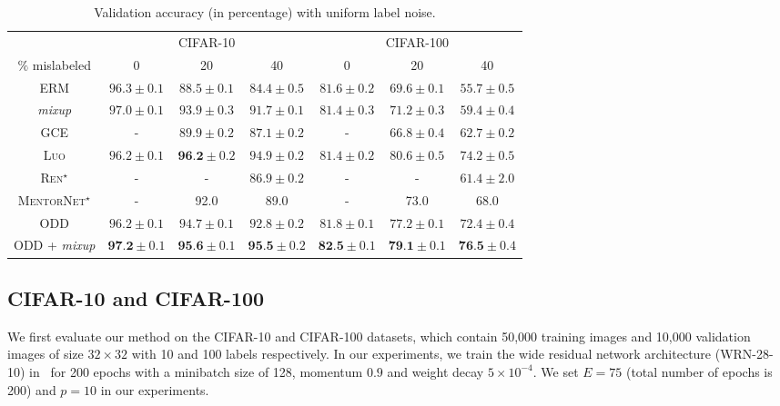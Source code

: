 \documentclass[a4paper,11pt]{article}
\begin{document}
\begin{table*}[htbp]
\begin{center}
\caption{Validation accuracy (in percentage) with uniform label noise.}
\label{tab:cifar-val}
\begin{tabular}{c|ccc|ccc}
\toprule
& \multicolumn{3}{c|}{CIFAR-10} & \multicolumn{3}{c}{CIFAR-100} \\
$\%$ mislabeled                                           & 0                              & 20                              & 40                & 0 & 20 & 40             \\\midrule
\textsc{ERM}                                           & $96.3 \pm 0.1$ & $88.5 \pm 0.1$ & $84.4 \pm 0.5$ &  $81.6 \pm 0.2$ & $69.6 \pm 0.1$ & $55.7 \pm 0.5$ \\
\textit{mixup}                                                &           ${97.0} \pm 0.1$     & $93.9 \pm 0.3$ & $91.7 \pm 0.1$  & $81.4 \pm 0.3$ & $71.2 \pm 0.3$ & $59.4 \pm 0.4$  \\
\textsc{GCE}     &  -  & $89.9 \pm 0.2$  & $87.1 \pm 0.2$  & - & $66.8 \pm 0.4$ & $62.7 \pm 0.2$ \\
\textsc{Luo} & $96.2 \pm 0.1 $ & $\textbf{96.2} \pm 0.2$ & $94.9 \pm 0.2$ & $81.4 \pm 0.2$ & $80.6 \pm 0.5$ & $74.2 \pm 0.5$ \\
\midrule
\textsc{Ren}$^\star$   &    -    &    -     & $86.9 \pm 0.2$ & - & - & $61.4 \pm 2.0$  \\
\textsc{MentorNet}$^\star$ &   -      & 92.0    & 89.0  & - & 73.0 & 68.0 \\\midrule
\textsc{ODD}                              & $96.2 \pm 0.1$ & ${94.7} \pm 0.1$  & ${92.8} \pm 0.2$ & ${81.8} \pm 0.1$ & ${77.2} \pm 0.1$  & ${72.4} \pm 0.4$    \\
\textsc{ODD} + \textit{mixup}                              & $\textbf{97.2} \pm 0.1$ & $\textbf{95.6} \pm 0.1$  & $\textbf{95.5} \pm 0.2$ & $\textbf{82.5} \pm 0.1$ & $\textbf{79.1} \pm 0.1$  & $\textbf{76.5} \pm 0.4$    \\
\bottomrule                          
\end{tabular}
\end{center}
\end{table*}

\subsection{CIFAR-10 and CIFAR-100}
\label{sec:exp-cifar}
We first evaluate our method on the CIFAR-10 and CIFAR-100 datasets, which contain 50,000 training images and 10,000 validation images of size $32 \times 32$ with 10 and 100 labels respectively. 
In our experiments, we train the wide residual network architecture (WRN-28-10) in~\cite{zagoruyko2016wide} for 200 epochs with a minibatch size of 128, momentum $0.9$ and weight decay $5 \times 10^{-4}$. We set $E = 75$ (total number of epochs is 200) and $p = 10$ in our experiments.
\end{document}
